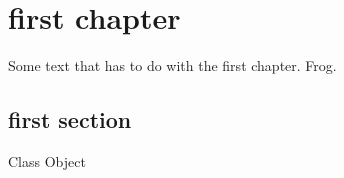 \documentclass[
    letterpaper %
]{book}
\begin{document}
\tableofcontents
\listoffigures

\chapter{first chapter}

Some text that has to do with the first chapter.  Frog.

\section{first section}

Class 
Object 

\printindex
\end{document}
